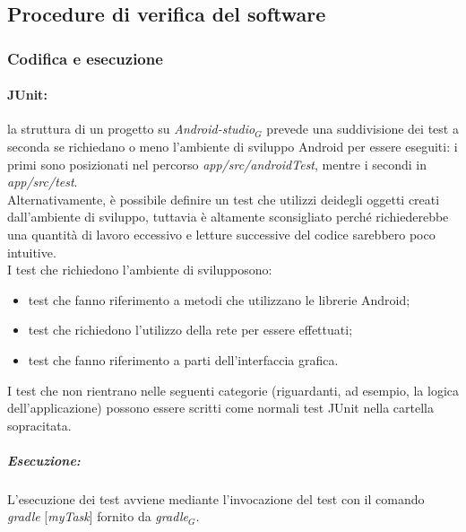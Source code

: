 \subsection{Procedure di verifica del software}
\subsubsection{Codifica e esecuzione}
\paragraph{JUnit:}
la struttura di un progetto su \textit{Android-studio$_{G}$} prevede una suddivisione dei test a seconda se richiedano o meno l'ambiente di sviluppo Android per essere eseguiti: i primi sono posizionati nel percorso \textit{app/src/androidTest}, mentre i secondi in \textit{app/src/test}.\\
Alternativamente, è possibile definire un test che utilizzi deidegli oggetti creati dall'ambiente di sviluppo, tuttavia è altamente sconsigliato perché richiederebbe una quantità di lavoro eccessivo e letture successive del codice sarebbero poco intuitive.\\
I test che richiedono l'ambiente di svilupposono:
\begin{itemize}
	\item test che fanno riferimento a metodi che utilizzano le librerie Android; 
	\item test che richiedono l'utilizzo della rete per essere effettuati; 
	\item test che fanno riferimento a parti dell'interfaccia grafica.
\end{itemize}
I test che non rientrano nelle seguenti categorie (riguardanti, ad esempio, la logica dell'applicazione) possono essere scritti come normali test JUnit nella cartella sopracitata.
\subparagraph{Esecuzione:} L'esecuzione dei test avviene mediante l'invocazione del test con il comando \textit{gradle} [\textit{myTask}] fornito da \textit{gradle$_{G}$}. 

